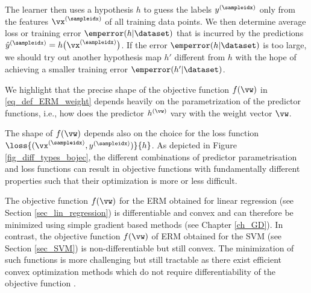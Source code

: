 \documentclass[12pt]{report}
\begin{document}
The learner then uses a hypothesis $h$ to guess the labels $y^{(\sampleidx)}$ 
only from the features $\vx^{(\sampleidx)}$ of all training data points. We then 
determine average loss or training error $\emperror(h|\dataset)$ that is incurred 
by the predictions $\hat{y}^{(\sampleidx)} = h\big( \vx^{(\sampleidx)} \big)$. 
If the error $\emperror(h|\dataset)$ is too large, we should try out another  
hypothesis map $h'$ different from $h$ with the hope of achieving a smaller 
training error $\emperror(h'|\dataset)$. 

%

We highlight that the precise shape of the objective function 
$f(\vw)$ in \eqref{eq_def_ERM_weight} depends heavily on the 
parametrization of the predictor functions, i.e., how does the 
predictor $h^{(\vw)}$ vary with the weight vector $\vw$. 

The shape of $f(\vw)$ depends also on the choice for the loss 
function $\loss{(\vx^{(\sampleidx)},y^{(\sampleidx)})}{h}$. As 
depicted in Figure \ref{fig_diff_types_bojec}, the different combinations 
of predictor parametrisation and loss functions can result in objective 
functions with fundamentally different properties such that their 
optimization is more or less difficult. 

The objective function $f(\vw)$ for the ERM obtained for linear 
regression (see Section \ref{sec_lin_regression}) is differentiable 
and convex and can therefore be minimized using simple 
gradient based  methods (see Chapter \ref{ch_GD}). In contrast, 
the objective function $f(\vw)$ of ERM obtained for the SVM (see 
Section \ref{sec_SVM}) is non-differentiable but still convex. The 
minimization of such functions is more challenging but still tractable 
as there exist efficient convex optimization methods which do not 
require differentiability of the objective function \cite{ProximalMethods}. 
\end{document}
